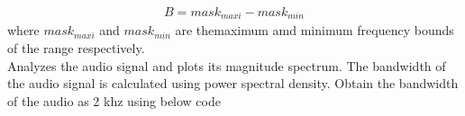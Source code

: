 \begin{enumerate}[label=\arabic*.,ref=\thesection.\theenumi]
\begin{align*}
B=mask_{maxi}-mask_{min}
\end{align*}
where $mask_{maxi}$ and $mask_{min} $ are themaximum amd minimum frequency bounds of the range  respectively.\\
Analyzes the audio signal and plots its magnitude spectrum. The bandwidth of the audio signal is  calculated using power spectral density. Obtain the bandwidth of the audio as 2 khz using below code
\begin{center}
\end{center}
\end{enumerate}

